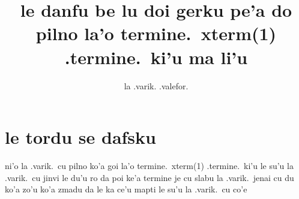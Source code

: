 \documentclass{article}
\title{le danfu be lu doi gerku pe'a do pilno la'o termine.\ xterm(1) .termine.\ ki'u ma li'u}
\author{la .varik. .valefor.}
\begin{document}
\maketitle

\section{le tordu se dafsku}
ni'o la .varik.\ cu pilno ko'a goi la'o termine.\ xterm(1) .termine.\ ki'u le su'u la .varik.\ cu jinvi le du'u ro da poi ke'a termine je cu slabu la .varik.\ jenai cu du ko'a zo'u ko'a zmadu da le ka ce'u mapti le su'u la .varik.\ cu co'e
\end{document}
